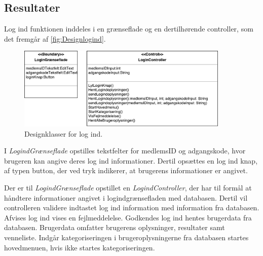 \subsection{Resultater}

Log ind funktionen inddeles i en grænseflade og en dertilhørende controller, som det fremgår af \autoref{fig:Designlogind}. 

\begin{figure} [H]
\centering
\includegraphics[width=0.9\textwidth]{figures/MVC/MVCLogInd}
\caption{Designklasser for log ind.}
\label{fig:Designlogind}
\end{figure}

I \textit{LogindGrænseflade} opstilles tekstfelter for medlemsID og adgangskode, hvor brugeren kan angive deres log ind informationer. Dertil opsættes en log ind knap, af typen button, der ved tryk indikerer, at brugerens informationer er angivet. 

Der er til \textit{LogindGrænseflade} opstillet en \textit{LogindController}, der har til formål at håndtere informationer angivet i logindgrænsefladen med databasen. Dertil vil controlleren validere indtastet log ind information med information fra databasen. Afvises log ind vises en fejlmeddelelse. Godkendes log ind hentes brugerdata fra databasen. Brugerdata omfatter brugerens oplysninger, resultater samt venneliste. Indgår kategoriseringen i brugeroplysningerne fra databasen startes hovedmenuen, hvis ikke startes kategoriseringen. 
